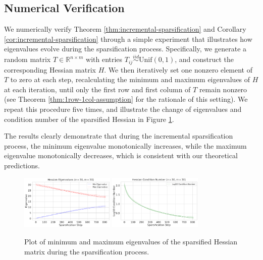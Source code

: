 \documentclass{article}
\theoremstyle{plain}
\theoremstyle{definition}
\theoremstyle{remark}
\begin{document}
\subsection{Numerical Verification}
We numerically verify Theorem \ref{thm:incremental-sparsification} and Corollary \ref{cor:incremental-sparsification} through a simple experiment that illustrates how eigenvalues evolve during the sparsification process. Specifically, we generate a random matrix $T \in \mathbb{R}^{n \times m}$ with entries $T_{ij} \overset{iid}{\sim} \text{Unif}(0, 1)$, and construct the corresponding Hessian matrix $H$. We then iteratively set one nonzero element of $T$ to zero at each step, recalculating the minimum and maximum eigenvalues of $H$ at each iteration, until only the first row and first column of $T$
remain nonzero (see Theorem \ref{thm:1row-1col-assumption} for the rationale of this setting). 
We repeat this procedure five times, and illustrate the change of eigenvalues and condition number of the sparsified Hessian in Figure \ref{fig:eigenvalue_sparsification}.

The results clearly demonstrate that during the incremental sparsification process, the minimum eigenvalue monotonically increases, while the maximum eigenvalue monotonically decreases, which is consistent with our theoretical predictions.

\begin{figure}[htb]
    \centering
    \includegraphics[width=0.4\textwidth]{save/eigen/eigenvalues_n30_m30}
    \includegraphics[width=0.4\textwidth]{save/eigen/condition_number_n30_m30} \\
    \caption{Plot of minimum and maximum eigenvalues of the sparsified Hessian matrix during the sparsification process.}
    \label{fig:eigenvalue_sparsification}
\end{figure}
\end{document}
